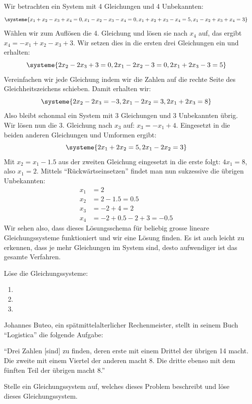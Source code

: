 \documentclass[11pt,oneside]{article}
\begin{document}
	\begin{beispiel}
		Wir betrachten ein System mit 4 Gleichungen und 4 Unbekannten:
		\begin{equation*}
			\systeme{x_1+x_2-x_3+x_4=0, x_1-x_2-x_3-x_4=0, x_1+x_2+x_3-x_4=5, x_1-x_2+x_3+x_4=3}
		\end{equation*}
		Wählen wir zum Auflösen die 4. Gleichung und lösen sie nach $x_4$ auf, das ergibt $x_4=-x_1+x_2-x_3+3$. Wir setzen dies in die ersten drei Gleichungen ein und erhalten:
		\begin{equation*}
			\systeme{2x_2-2x_3+3=0, 2x_1-2x_2-3=0, 2x_1+2x_3-3=5}
		\end{equation*}
		Vereinfachen wir jede Gleichung indem wir die Zahlen auf die rechte Seite des Gleichheitszeichens schieben. Damit erhalten wir:
		\begin{equation*}
			\systeme{2x_2-2x_3=-3, 2x_1-2x_2=3, 2x_1+2x_3=8}
		\end{equation*}
		Also bleibt schonmal ein System mit 3 Gleichungen und 3 Unbekannten übrig. Wir lösen nun die 3. Gleichung nach $x_3$ auf: $x_3=-x_1+4$. Eingesetzt in die beiden anderen Gleichungen und Umformen ergibt:
		\begin{equation*}
			\systeme{2x_1+2x_2=5, 2x_1-2x_2=3}
		\end{equation*}
		Mit $x_2=x_1-1.5$ aus der zweiten Gleichung eingesetzt in die erste folgt: $4x_1=8$, also $x_1=2$. Mittels "`Rückwärtseinsetzen"' findet man nun sukzessive die übrigen Unbekannten:
		\begin{align*}
			x_1&=2\\
			x_2&=2-1.5=0.5\\
			x_3&=-2+4=2\\
			x_4&=-2+0.5-2+3=-0.5
		\end{align*}
		Wir sehen also, dass dieses Lösungsschema für beliebig grosse lineare Gleichungssysteme funktioniert und wir eine Lösung finden. Es ist auch leicht zu erkennen, dass je mehr Gleichungen im System sind, desto aufwendiger ist das gesamte Verfahren.
	\end{beispiel}
	\begin{aufgabe}
		Löse die Gleichungssysteme:
		\begin{enumerate}[label=\alph*)]
			\item {}
			\item {}
			\item {}
		\end{enumerate}
	\end{aufgabe}
	\begin{aufgabe}
		Johannes Buteo, ein spätmittelalterlicher Rechenmeister, stellt in seinem Buch "`Logistica"' die folgende Aufgabe: \begin{framed}"`Drei Zahlen [sind] zu finden,  deren erste mit einem Drittel der übrigen 14 macht. Die zweite mit einem Viertel der anderen macht 8. Die dritte ebenso mit dem fünften Teil der übrigen macht 8."'\end{framed}
		Stelle ein Gleichungssystem auf, welches dieses Problem beschreibt und löse dieses Gleichungssystem.
	\end{aufgabe}\vspace{-0.5cm}
\end{document}

